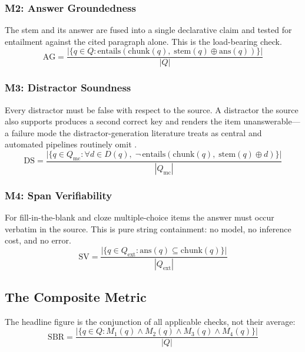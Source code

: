 \documentclass[stu,11pt,floatsintext]{apa7}
\begin{document}
\subsubsection{M2: Answer Groundedness} The stem and its answer are fused into a
single declarative claim and tested for entailment against the cited paragraph
alone. This is the load-bearing check.
\begin{equation}
\mathrm{AG} = \frac{\bigl|\{q \in Q : \mathrm{entails}(\mathrm{chunk}(q),\; \mathrm{stem}(q) \oplus \mathrm{ans}(q))\}\bigr|}{|Q|}
\end{equation}

\subsubsection{M3: Distractor Soundness} Every distractor must be false with
respect to the source. A distractor the source also supports produces a second
correct key and renders the item unanswerable---a failure mode the
distractor-generation literature treats as central and automated pipelines
routinely omit \parencite{alhazmi2024distractor}.
\begin{equation}
\mathrm{DS} = \frac{\bigl|\{q \in Q_{\mathrm{mc}} : \forall d \in D(q),\; \neg\,\mathrm{entails}(\mathrm{chunk}(q),\; \mathrm{stem}(q) \oplus d)\}\bigr|}{|Q_{\mathrm{mc}}|}
\end{equation}

\subsubsection{M4: Span Verifiability} For fill-in-the-blank and cloze
multiple-choice items the answer must occur verbatim in the source. This is pure
string containment: no model, no inference cost, and no error.
\begin{equation}
\mathrm{SV} = \frac{\bigl|\{q \in Q_{\mathrm{ext}} : \mathrm{ans}(q) \subseteq \mathrm{chunk}(q)\}\bigr|}{|Q_{\mathrm{ext}}|}
\end{equation}

\subsection{The Composite Metric}

The headline figure is the conjunction of all applicable checks, not their
average:
\begin{equation}
\mathrm{SBR} = \frac{\bigl|\{q \in Q : M_1(q) \wedge M_2(q) \wedge M_3(q) \wedge M_4(q)\}\bigr|}{|Q|}
\end{equation}
\end{document}

